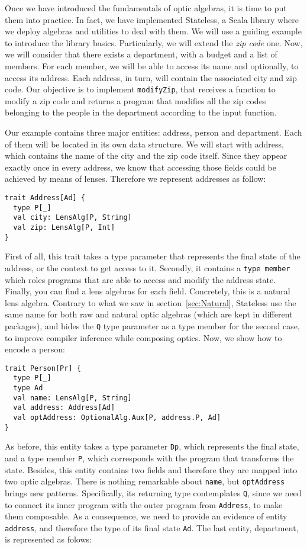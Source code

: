 \documentclass[preview, 3p]{elsarticle}
\begin{document}
Once we have introduced the fundamentals of optic algebras, it is time to put
them into practice. In fact, we have implemented Stateless, a Scala library
where we deploy algebras and utilities to deal with them. We will use a guiding
example to introduce the library basics. Particularly, we will extend the
\emph{zip code} one. Now, we will consider that there exists a department, with
a budget and a list of members. For each member, we will be able to access its
name and optionally, to access its address. Each address, in turn, will contain
the associated city and zip code. Our objective is to implement
\lstinline{modifyZip}, that receives a function to modify a zip code and returns
a program that modifies all the zip codes belonging to the people in the
department according to the input function.

Our example contains three major entities: address, person and department. Each
of them will be located in its own data structure. We will start with address,
which contains the name of the city and the zip code itself. Since they appear
exactly once in every address, we know that accessing those fields could be
achieved by means of lenses. Therefore we represent addresses as follow:

\begin{lstlisting}
trait Address[Ad] {
  type P[_]
  val city: LensAlg[P, String]
  val zip: LensAlg[P, Int]
}
\end{lstlisting}

First of all, this trait takes a type parameter that represents the final state
of the address, or the context to get access to it. Secondly, it contains a
\lstinline{type member} which roles programs that are able to access and modify
the address state. Finally, you can find a lens algebras for each field.
Concretely, this is a natural lens algebra. Contrary to what we saw in
section~\ref{sec:Natural}, Stateless use the same name for both raw and natural
optic algebras (which are kept in different packages), and hides the
\lstinline{Q} type parameter as a type member for the second case, to improve
compiler inference while composing optics. Now, we show how to encode a person:

\begin{lstlisting}
trait Person[Pr] {
  type P[_]
  type Ad
  val name: LensAlg[P, String]
  val address: Address[Ad]
  val optAddress: OptionalAlg.Aux[P, address.P, Ad]
}
\end{lstlisting}

As before, this entity takes a type parameter \lstinline{Dp}, which represents
the final state, and a type member \lstinline{P}, which corresponds with the
program that transforms the state. Besides, this entity contains two fields and
therefore they are mapped into two optic algebras. There is nothing remarkable
about \lstinline{name}, but \lstinline{optAddress} brings new patterns.
Specifically, its returning type contemplates \lstinline{Q}, since we need to
connect its inner program with the outer program from \lstinline{Address}, to
make them composable. As a consequence, we need to provide an evidence of entity
\lstinline{address}, and therefore the type of its final state \lstinline{Ad}.
The last entity, department, is represented as folows:
\end{document}
